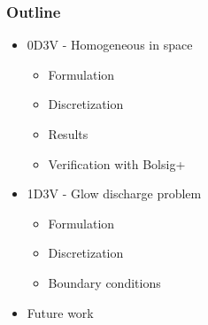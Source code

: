\documentclass[mathserif, aspectratio=169]{beamer}
\begin{document}
\begin{frame}
	\frametitle{Outline}
	\begin{itemize}
		\item \large 0D3V - Homogeneous in space
		\begin{itemize}
			\item \large Formulation
			\item Discretization
			\item Results
			\item Verification with Bolsig+
		\end{itemize}
		\item 1D3V - Glow discharge problem
		\begin{itemize}
			\item \large Formulation
			\item Discretization
			\item Boundary conditions
		\end{itemize}
		\item Future work
	\end{itemize}
\end{frame}
\end{document}
